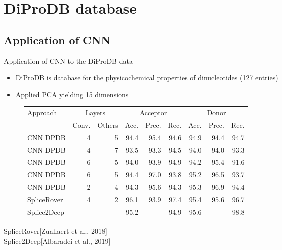 \documentclass[10pt]{beamer}
\begin{document}
\section{DiProDB database}

\subsection{Application of CNN}
\begin{frame}{Application of CNN to the DiProDB data}
	\begin{itemize}
		\item DiProDB is database for the physicochemical properties of dinucleotides (127 entries)
		\item Applied PCA yielding 15 dimensions
	\end{itemize}
	\pause
	\begin{figure}
		\small
		\centering
		\begingroup
		\def\arraystretch{1.2}
		\begin{tabular}{|l|r|r|r|r|r|r|r|r|}
			\hline
			Approach  & \multicolumn{2}{c}{Layers} & \multicolumn{3}{|c|}{Acceptor} & \multicolumn{3}{c|}{Donor} \\
			\cline{2-9}
			&Conv. & Others & Acc. & Prec. & Rec. & Acc. & Prec. & Rec. \\
			\hline
			CNN DPDB & 4 & 5 & 94.4 & 95.4 & 94.6 & 94.9 & 94.4 & 94.7 \\
			CNN DPDB & 4 & 7 & 93.5 & 93.3 & 94.5 & 94.0 & 94.0 & 93.3 \\
			CNN DPDB & 6 & 5 & 94.0 & 93.9 & 94.9 & 94.2 & 95.4 & 91.6 \\
			CNN DPDB & 6 & 5 & 94.4 & 97.0 & 93.8 & 95.2 & 96.5 & 93.7 \\
			CNN DPDB & 2 & 4 & 94.3 & 95.6 & 94.3 & 95.3 & 96.9 & 94.4 \\
			SpliceRover & 4 & 2 & 96.1 & 93.9 & 97.4 & 95.4 & 95.6 & 96.7 \\
			Splice2Deep & - & - & 95.2 &  -- & 94.9 & 95.6 & -- & 98.8\\
			
			\hline  
		\end{tabular}
		\endgroup
	\end{figure}
	SpliceRover[Zuallaert et al., 2018]\\
	Splice2Deep[Albaradei et al., 2019]
\end{frame}
\end{document}
